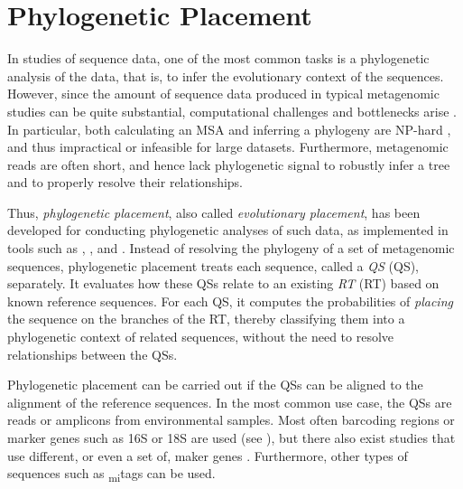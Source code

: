 
\section{Phylogenetic Placement}
\label{ch:Foundations:sec:PhylogeneticPlacement}

In studies of sequence data, one of the most common tasks is a phylogenetic analysis of the data,
that is, to infer the evolutionary context of the sequences.
However, since the amount of sequence data produced in typical metagenomic studies can be quite substantial,
computational challenges and bottlenecks arise \cite{Scholz2012}.
In particular, both calculating an MSA and inferring a phylogeny are NP-hard \cite{Just2001,Chor2005},
and thus impractical or infeasible for large datasets.
Furthermore, metagenomic reads are often short, and hence lack phylogenetic signal
to robustly infer a tree and to properly resolve their relationships.

Thus, \emph{phylogenetic placement}, also called \emph{evolutionary placement},
has been developed for conducting phylogenetic analyses of such data,
as implemented in tools such as
 \cite{Matsen2010},  \cite{Berger2011}, and  \cite{Barbera2018}.
Instead of resolving the phylogeny of a set of metagenomic sequences,
phylogenetic placement treats each sequence, called a \emph{\acl{QS}} (\acs{QS}), separately.
It evaluates how these \acp{QS} relate to an existing \emph{\acl{RT}} (\acs{RT}) based on known reference sequences.
For each \ac{QS}, it computes the probabilities of \emph{placing} the sequence on the branches of the \ac{RT},
thereby classifying them into a phylogenetic context of related sequences,
without the need to resolve relationships between the \acp{QS}.

Phylogenetic placement can be carried out if the \acp{QS} can be aligned to the alignment of the reference sequences.
In the most common use case, the \acp{QS} are reads or amplicons from environmental samples.
Most often barcoding regions or marker genes such as 16S or 18S are used
(see ),
but there also exist studies that use different, or even a set of, maker genes \citep{Sunagawa2013a}.
Furthermore, other types of sequences such as \textsubscript{mi}tags \citep{Logares2014} can be used.

